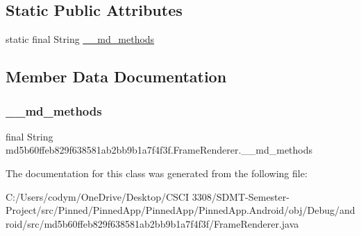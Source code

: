 \subsection*{Static Public Attributes}
\begin{DoxyCompactItemize}
\item 
static final String \hyperlink{classmd5b60ffeb829f638581ab2bb9b1a7f4f3f_1_1_frame_renderer_ad51663e7802471a9ec8a28e818f4c43f}{\+\_\+\+\_\+md\+\_\+methods}
\end{DoxyCompactItemize}


\subsection{Member Data Documentation}
\mbox{\label{classmd5b60ffeb829f638581ab2bb9b1a7f4f3f_1_1_frame_renderer_ad51663e7802471a9ec8a28e818f4c43f}} 
\subsubsection{\texorpdfstring{\+\_\+\+\_\+md\+\_\+methods}{\_\_md\_methods}}
{\footnotesize\ttfamily final String md5b60ffeb829f638581ab2bb9b1a7f4f3f.\+Frame\+Renderer.\+\_\+\+\_\+md\+\_\+methods\hspace{0.3cm}{\ttfamily [static]}}



The documentation for this class was generated from the following file\+:\begin{DoxyCompactItemize}
\item 
C\+:/\+Users/codym/\+One\+Drive/\+Desktop/\+C\+S\+C\+I 3308/\+S\+D\+M\+T-\/\+Semester-\/\+Project/src/\+Pinned/\+Pinned\+App/\+Pinned\+App/\+Pinned\+App.\+Android/obj/\+Debug/android/src/md5b60ffeb829f638581ab2bb9b1a7f4f3f/Frame\+Renderer.\+java\end{DoxyCompactItemize}
